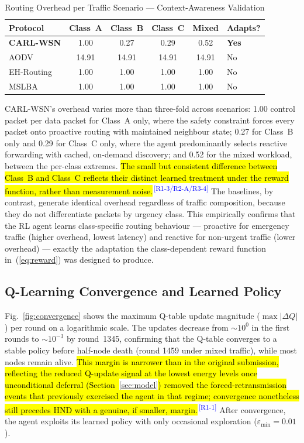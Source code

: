 \documentclass[12pt]{article}
\newcommand{\rtag}[1]{\textsuperscript{\textcolor{blue}{\scriptsize\,[#1]}}}
\newcommand{\hlx}[1]{{\exhyphenpenalty=10000\hyphenpenalty=10000\let\ \nobreakspace\hl{#1}}}
\begin{document}
\begin{table}[!t]
\renewcommand{\arraystretch}{1.2}
\caption{Routing Overhead per Traffic Scenario --- Context-Awareness Validation}
\label{tab:context}
\centering
\begin{tabular}{lccccl}
\hline
\textbf{Protocol} & \textbf{Class~A} & \textbf{Class~B} &
\textbf{Class~C} & \textbf{Mixed} & \textbf{Adapts?} \\
\hline
\textbf{CARL-WSN} & 1.00 & 0.27 & 0.29 & 0.52 & \textbf{Yes} \\
AODV              & 14.91 & 14.91 & 14.91 & 14.91 & No \\
EH-Routing        & 1.00 & 1.00 & 1.00 & 1.00 & No \\
MSLBA             & 1.00 & 1.00 & 1.00 & 1.00 & No \\
\hline
\end{tabular}
\end{table}

CARL-WSN's overhead varies more than three-fold across scenarios:
1.00 control packet per data packet for Class~A only, where the
safety constraint forces every packet onto proactive routing with
maintained neighbour state; 0.27 for Class~B only and 0.29 for
Class~C only, where the agent predominantly selects reactive
forwarding with cached, on-demand discovery; and 0.52 for the mixed
workload, between the per-class extremes. \hlx{The small but consistent
difference between Class~B and Class~C reflects their distinct
learned treatment under the reward function, rather than measurement
noise.}\rtag{R1-3/R2-A/R3-4} The baselines, by contrast, generate identical overhead
regardless of traffic composition, because they do not differentiate
packets by urgency class. This empirically confirms that the RL
agent learns class-specific routing behaviour --- proactive for
emergency traffic (higher overhead, lowest latency) and reactive for
non-urgent traffic (lower overhead) --- exactly the adaptation the
class-dependent reward function in~(\ref{eq:reward}) was designed to
produce.

\subsection{Q-Learning Convergence and Learned Policy}

Fig.~\ref{fig:convergence} shows the maximum Q-table update
magnitude ($\max|\Delta Q|$) per round on a logarithmic scale. The
updates decrease from $\sim\!10^0$ in the first rounds to
$\sim\!10^{-3}$ by round~1345, confirming that the Q-table converges
to a stable policy before half-node death (round 1459 under mixed
traffic), while most nodes remain alive. \hlx{This margin is narrower
than in the original submission, reflecting the reduced Q-update
signal at the lowest energy levels once unconditional deferral
(Section~}\ref{sec:model}\hlx{) removed the forced-retransmission events
that previously exercised the agent in that regime; convergence
nonetheless still precedes HND with a genuine, if smaller,
margin.}\rtag{R1-1} After convergence, the agent exploits its learned policy with only
occasional exploration ($\varepsilon_{\min} = 0.01$).
\end{document}

